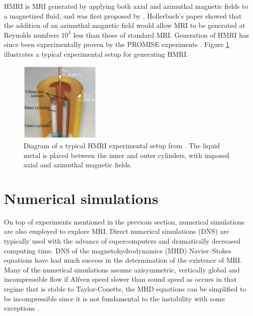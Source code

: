 \documentclass{jfm}
\begin{document}
HMRI is MRI generated by applying both axial and azimuthal magnetic fields to a 
magnetized fluid, and was first proposed by \cite{Hollerbach2005}. Hollerbach's
paper showed that the addition of an azimuthal magnetic field would allow MRI
to be generated at Reynolds numbers $10^3$ less than those of standard MRI. 
Generation of HMRI has since been experimentally proven by the PROMISE experiments
\citep[see][]{Stefani2006, Stefani2007, Stefani2009, Stefani2012}. Figure 
\ref{fig:diagram_hrmi} illustrates a typical experimental setup for generating HMRI.

\begin{figure}
    \centering
    \includegraphics[width=0.35\textwidth]{HMRI_diagram}
    \caption{Diagram of a typical HMRI experimental setup from \cite{Ji2010}. The liquid metal is placed between the inner and outer cylinders, with imposed axial and azimuthal magnetic fields.}
    \label{fig:diagram_hrmi}
\end{figure}



\section{Numerical simulations}

On top of experiments mentioned in the previous section, numerical simulations
are also employed to explore MRI. Direct numerical simulations (DNS) are
typically used with the advance of supercomputers and dramatically decreased
computing time. DNS of the magnetohydrodynamics (MHD) Navier--Stokes equations
have had much success in the determination of the existence of MRI. Many of the
numerical simulations assume axisymmetric, vertically global and incompressible
flow if Alfven speed slower than sound speed as occurs in that regime that is
stable to Taylor-Couette, the MHD equations can be simplified to be
incompressible since it is not fundamental to the instability
\citep{Balbus1991} with some exceptions \citep{Sano1998}.
\end{document}
